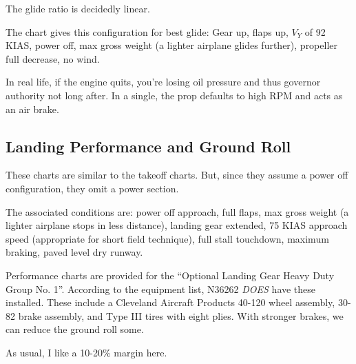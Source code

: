 The glide ratio is decidedly linear.

The chart gives this configuration for best glide: Gear up, flaps up, $V_Y$ of 92 KIAS, power off, max gross weight (a lighter airplane glides further), propeller full decrease, no wind.

In real life, if the engine quits, you're losing oil pressure and thus governor authority not long after. In a single, the prop defaults to high RPM and acts as an air brake.

\subsection{Landing Performance and Ground Roll}

These charts are similar to the takeoff charts. But, since they assume a power off configuration, they omit a power section.

The associated conditions are: power off approach, full flaps, max gross weight (a lighter airplane stops in less distance), landing gear extended, 75 KIAS approach speed (appropriate for short field technique), full stall touchdown, maximum braking, paved level dry runway.

Performance charts are provided for the ``Optional Landing Gear Heavy Duty Group No. 1''. According to the equipment list, N36262 \emph{DOES} have these installed. These include a Cleveland Aircraft Products 40-120 wheel assembly, 30-82 brake assembly, and Type III tires with eight plies. With stronger brakes, we can reduce the ground roll some.

As usual, I like a 10-20\% margin here.












